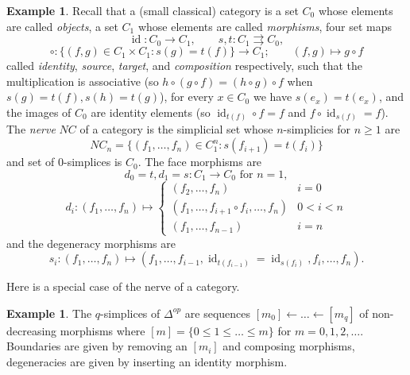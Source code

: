 \documentclass[a4paper]{amsart}
\numberwithin{figure}{section}
\theoremstyle{theorem}
\theoremstyle{definition}
\newtheorem{exam}[thm]{Example}
\DeclareMathOperator{\id}{id}
\begin{document}
\begin{exam} \label{exam:nc}
Recall that a (small classical) category is a set $C_0$ whose elements are called \emph{objects}, a set $C_1$ whose elements are called \emph{morphisms}, four set maps 
\[ \id: C_0 \to C_1, \qquad s, t: C_1 \rightrightarrows C_0, \]
\[ \circ: \{ (f, g) \in C_1 \times C_1 : s(g) = t(f) \} \to C_1; \qquad (f,g) \mapsto g \circ f \]
called \emph{identity}, \emph{source}, \emph{target}, and \emph{composition} respectively, such that the multiplication is associative (so $h\circ(g\circ f) = (h \circ g) \circ f$ when $s(g) = t(f), s(h) = t(g)$), for every $x \in C_0$ we have $s(e_x) = t(e_x)$, and the images of $C_0$ are identity elements (so $\id_{t(f)} \circ f = f$ and $f \circ \id_{s(f)} = f$). The \emph{nerve} $NC$ of a category is the simplicial set whose $n$-simplicies for $n \geq 1$ are 
\[ NC_n = \{ (f_1, \dots, f_n) \in C_1^n : s(f_{i{+}1}) = t(f_i) \} \]
and set of $0$-simplices is $C_0$. The face morphisms are
\[ d_0 = t, d_1 = s: C_1 \to C_0 \textrm{ for } n = 1, \]
\[ d_i: (f_1, \dots, f_n) \mapsto \left \{ \begin{array}{cc}
(f_2, \dots, f_n) & i = 0 \\
(f_1, \dots, f_{i+1} \circ f_i, \dots, f_n) & 0 < i < n \\
(f_1, \dots, f_{n-1}) & i = n
\end{array} \right . \]
and the degeneracy morphisms are 
\[ s_i: (f_1, \dots, f_n) \mapsto (f_1, \dots, f_{i-1}, \id_{t(f_{i{-}1})} = \id_{s(f_i)}, f_i, \dots, f_n). \]
\end{exam}

Here is a special case of the nerve of a category.

\begin{exam} \label{exam:delta}
The $q$-simplices of $\Delta^{op}$ are sequences $[m_0] {\leftarrow} \dots {\leftarrow} [m_q]$ of non-decreasing morphisms where $[m]  = \{0 \leq 1 \leq \dots \leq m \}$ for $m = 0, 1, 2, \dots$. Boundaries are given by removing an $[m_i]$ and composing morphisms, degeneracies are given by inserting an identity morphism.\end{exam}
\end{document}
